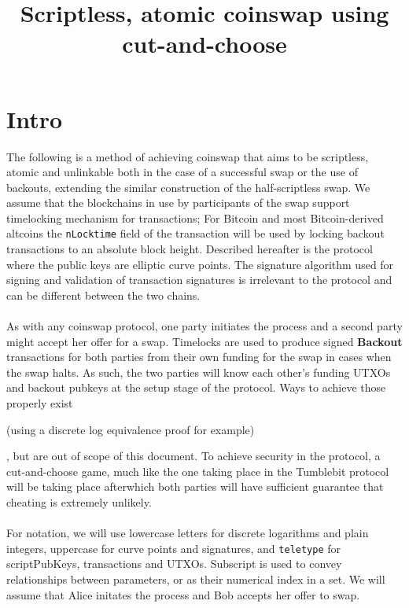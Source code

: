 \documentclass[12pt,a4paper]{article}
\title{Scriptless, atomic coinswap using cut-and-choose}
\date{\begin{tiny}version 0.1\end{tiny}}
\begin{document}
\maketitle
\section{Intro}
The following is a method of achieving coinswap\cite{gmaxwell} that aims to be scriptless, atomic and unlinkable both in the case of a successful swap or the use of backouts, extending the similar construction of the half-scriptless swap\cite{hss}.  We assume that the blockchains in use by participants of the swap support timelocking mechanism for transactions; For Bitcoin and most Bitcoin-derived altcoins the \texttt{nLocktime} field of the transaction will be used by locking backout transactions to an absolute block height.  Described hereafter is the protocol where the public keys are elliptic curve points.  The signature algorithm used for signing and validation of transaction signatures is irrelevant to the protocol and can be different between the two chains.
\\
\\
As with any coinswap protocol, one party initiates the process and a second party might accept her offer for a swap.  Timelocks are used to produce signed \textbf{Backout} transactions for both parties from their own funding for the swap in cases when the swap halts.  As such, the two parties will know each other's funding UTXOs and backout pubkeys at the setup stage of the protocol.  Ways to achieve those properly exist \begin{tiny}(using a discrete log equivalence proof for example)\end{tiny}, but are out of scope of this document.  To achieve security in the protocol, a cut-and-choose \cite{cnc} game, much like the one taking place in the Tumblebit \cite{tumblebit} protocol will be taking place afterwhich both parties will have sufficient guarantee that cheating is extremely unlikely.
\\
\\
For notation, we will use lowercase letters for discrete logarithms and plain integers, uppercase for curve points and signatures, and \texttt{teletype} for scriptPubKeys, transactions and UTXOs.  Subscript is used to convey relationships between parameters, or as their numerical index in a set.
We will assume that Alice initates the process and Bob accepts her offer to swap.
\end{document}
